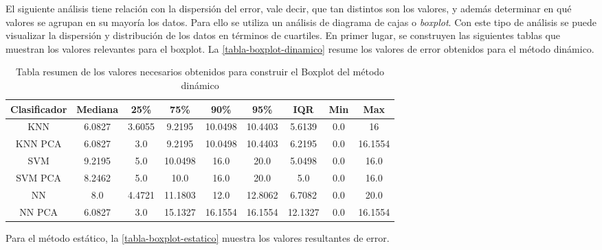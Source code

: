 El siguiente análisis tiene relación con la dispersión del error, vale decir, que tan distintos son los valores, y además determinar en qué valores se agrupan en su mayoría los datos. Para ello se utiliza un análisis de diagrama de cajas o \textit{boxplot}. Con este tipo de análisis se puede visualizar la dispersión y distribución de los datos en términos de cuartiles. En primer lugar, se construyen las siguientes tablas que muestran los valores relevantes para el boxplot. La \autoref{tabla-boxplot-dinamico} resume los valores de error obtenidos para el método dinámico.

\begin{table}[!ht]
\centering
\caption[Tabla Boxplot método dinámico]{Tabla resumen de los valores necesarios obtenidos para construir el Boxplot del método dinámico}
\label{tabla-boxplot-dinamico}
\begin{tabular}{|c|c|c|c|c|c|c|c|c|}
\hline
\textbf{Clasificador} & \textbf{Mediana} & \textbf{25\%} & \textbf{75\%} & \textbf{90\%} & \textbf{95\%} & \textbf{IQR} & \textbf{Min} & \textbf{Max} \\ \hline
KNN                   & 6.0827           & 3.6055        & 9.2195        & 10.0498       & 10.4403       & 5.6139       & 0.0            & 16           \\ \hline
KNN PCA               & 6.0827           & 3.0           & 9.2195        & 10.0498       & 10.4403       & 6.2195       & 0.0          & 16.1554      \\ \hline
SVM                   & 9.2195           & 5.0           & 10.0498       & 16.0          & 20.0          & 5.0498       & 0.0          & 16.0         \\ \hline
SVM PCA               & 8.2462           & 5.0           & 10.0          & 16.0          & 20.0          & 5.0          & 0.0          & 16.0         \\ \hline
NN                    & 8.0              & 4.4721        & 11.1803       & 12.0          & 12.8062       & 6.7082       & 0.0          & 20.0         \\ \hline
NN PCA                & 6.0827           & 3.0           & 15.1327       & 16.1554       & 16.1554       & 12.1327      & 0.0          & 16.1554      \\ \hline
\end{tabular}
\end{table}


Para el método estático, la \autoref{tabla-boxplot-estatico} muestra los valores resultantes de error.

